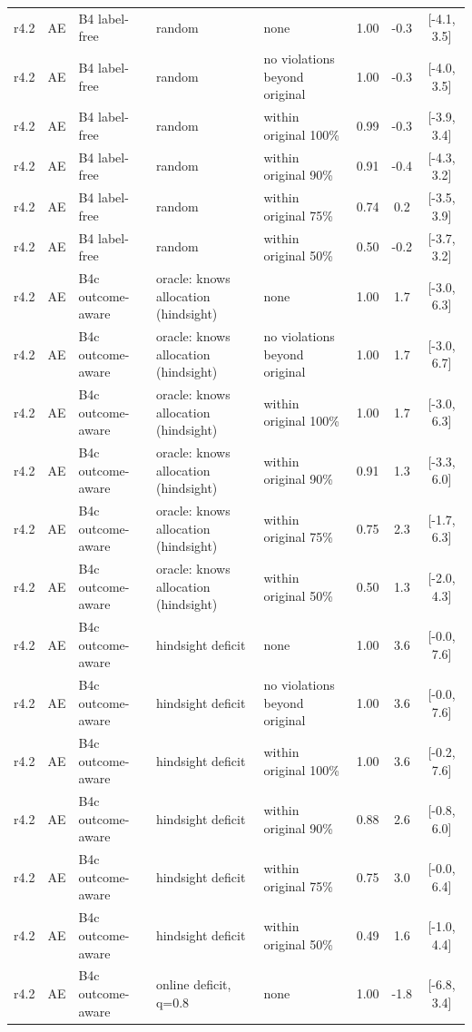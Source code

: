 \documentclass[10pt,onecolumn,letterpaper]{article}
\begin{document}
\begin{longtable}{lllp{4.2cm}p{3.4cm}ccc}
r4.2 & AE & B4 label-free & random & none & 1.00 & -0.3 & [-4.1, 3.5] \\
r4.2 & AE & B4 label-free & random & no violations beyond original & 1.00 & -0.3 & [-4.0, 3.5] \\
r4.2 & AE & B4 label-free & random & within original 100\% & 0.99 & -0.3 & [-3.9, 3.4] \\
r4.2 & AE & B4 label-free & random & within original 90\% & 0.91 & -0.4 & [-4.3, 3.2] \\
r4.2 & AE & B4 label-free & random & within original 75\% & 0.74 & 0.2 & [-3.5, 3.9] \\
r4.2 & AE & B4 label-free & random & within original 50\% & 0.50 & -0.2 & [-3.7, 3.2] \\
r4.2 & AE & B4c outcome-aware & oracle: knows allocation (hindsight) & none & 1.00 & 1.7 & [-3.0, 6.3] \\
r4.2 & AE & B4c outcome-aware & oracle: knows allocation (hindsight) & no violations beyond original & 1.00 & 1.7 & [-3.0, 6.7] \\
r4.2 & AE & B4c outcome-aware & oracle: knows allocation (hindsight) & within original 100\% & 1.00 & 1.7 & [-3.0, 6.3] \\
r4.2 & AE & B4c outcome-aware & oracle: knows allocation (hindsight) & within original 90\% & 0.91 & 1.3 & [-3.3, 6.0] \\
r4.2 & AE & B4c outcome-aware & oracle: knows allocation (hindsight) & within original 75\% & 0.75 & 2.3 & [-1.7, 6.3] \\
r4.2 & AE & B4c outcome-aware & oracle: knows allocation (hindsight) & within original 50\% & 0.50 & 1.3 & [-2.0, 4.3] \\
r4.2 & AE & B4c outcome-aware & hindsight deficit & none & 1.00 & 3.6 & [-0.0, 7.6] \\
r4.2 & AE & B4c outcome-aware & hindsight deficit & no violations beyond original & 1.00 & 3.6 & [-0.0, 7.6] \\
r4.2 & AE & B4c outcome-aware & hindsight deficit & within original 100\% & 1.00 & 3.6 & [-0.2, 7.6] \\
r4.2 & AE & B4c outcome-aware & hindsight deficit & within original 90\% & 0.88 & 2.6 & [-0.8, 6.0] \\
r4.2 & AE & B4c outcome-aware & hindsight deficit & within original 75\% & 0.75 & 3.0 & [-0.0, 6.4] \\
r4.2 & AE & B4c outcome-aware & hindsight deficit & within original 50\% & 0.49 & 1.6 & [-1.0, 4.4] \\
r4.2 & AE & B4c outcome-aware & online deficit, q=0.8 & none & 1.00 & -1.8 & [-6.8, 3.4] \\

\end{longtable}
\end{document}
